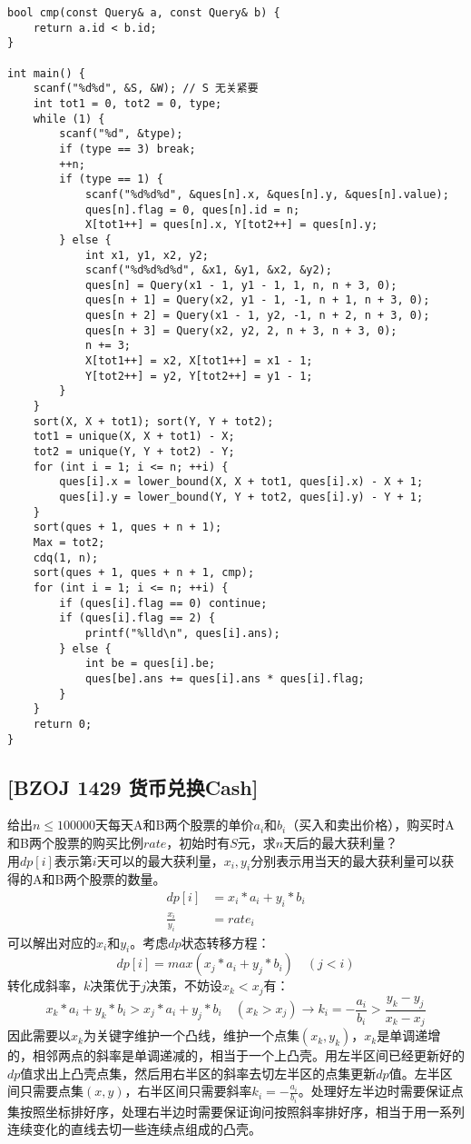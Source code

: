 \begin{lstlisting}
bool cmp(const Query& a, const Query& b) {
    return a.id < b.id;
}

int main() {
    scanf("%d%d", &S, &W); // S 无关紧要
    int tot1 = 0, tot2 = 0, type;
    while (1) {
        scanf("%d", &type);
        if (type == 3) break;
        ++n;
        if (type == 1) {
            scanf("%d%d%d", &ques[n].x, &ques[n].y, &ques[n].value);
            ques[n].flag = 0, ques[n].id = n;
            X[tot1++] = ques[n].x, Y[tot2++] = ques[n].y;
        } else {
            int x1, y1, x2, y2;
            scanf("%d%d%d%d", &x1, &y1, &x2, &y2);
            ques[n] = Query(x1 - 1, y1 - 1, 1, n, n + 3, 0);
            ques[n + 1] = Query(x2, y1 - 1, -1, n + 1, n + 3, 0);
            ques[n + 2] = Query(x1 - 1, y2, -1, n + 2, n + 3, 0);
            ques[n + 3] = Query(x2, y2, 2, n + 3, n + 3, 0);
            n += 3;
            X[tot1++] = x2, X[tot1++] = x1 - 1;
            Y[tot2++] = y2, Y[tot2++] = y1 - 1;
        }
    }
    sort(X, X + tot1); sort(Y, Y + tot2);
    tot1 = unique(X, X + tot1) - X;
    tot2 = unique(Y, Y + tot2) - Y;
    for (int i = 1; i <= n; ++i) {
        ques[i].x = lower_bound(X, X + tot1, ques[i].x) - X + 1;
        ques[i].y = lower_bound(Y, Y + tot2, ques[i].y) - Y + 1;
    }
    sort(ques + 1, ques + n + 1);
    Max = tot2;
    cdq(1, n);
    sort(ques + 1, ques + n + 1, cmp);
    for (int i = 1; i <= n; ++i) {
        if (ques[i].flag == 0) continue;
        if (ques[i].flag == 2) {
            printf("%lld\n", ques[i].ans);
        } else {
            int be = ques[i].be;
            ques[be].ans += ques[i].ans * ques[i].flag;
        }
    }
    return 0;
}
\end{lstlisting}
\subsection{[BZOJ 1429 货币兑换Cash]}
给出$n\leq 100000$天每天A和B两个股票的单价$a_i$和$b_i$（买入和卖出价格），购买时A和B两个股票的购买比例$rate$，初始时有$S$元，求$n$天后的最大获利量？\\

用$dp[i]$表示第$i$天可以的最大获利量，$x_i,y_i$分别表示用当天的最大获利量可以获得的A和B两个股票的数量。
$$
\begin{aligned}
dp[i]&=x_i*a_i+y_i*b_i \\
\frac{x_i}{y_i}&=rate_i
\end{aligned}
$$
可以解出对应的$x_i$和$y_i$。考虑$dp$状态转移方程：
$$
dp[i]=max(x_j*a_i+y_j*b_i)\quad (j < i)
$$
转化成斜率，$k$决策优于$j$决策，不妨设$x_k < x_j$有：
$$
x_k*a_i+y_k*b_i > x_j*a_i+y_j*b_i\quad (x_k > x_j) \rightarrow
k_i=-\frac{a_i}{b_i} > \frac{y_k-y_j}{x_k-x_j}
$$
因此需要以$x_k$为关键字维护一个凸线，维护一个点集$(x_k,y_k)$，$x_k$是单调递增的，相邻两点的斜率是单调递减的，相当于一个上凸壳。用左半区间已经更新好的$dp$值求出上凸壳点集，然后用右半区的斜率去切左半区的点集更新$dp$值。左半区间只需要点集$(x,y)$，右半区间只需要斜率$k_i=-\frac{a_i}{b_i}$。处理好左半边时需要保证点集按照坐标排好序，处理右半边时需要保证询问按照斜率排好序，相当于用一系列连续变化的直线去切一些连续点组成的凸壳。

